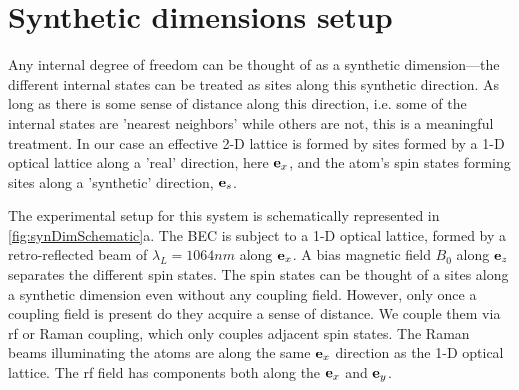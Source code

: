 %	

\section{Synthetic dimensions setup}\label{sec:SynDimSetup}

Any internal degree of freedom can be thought of as a synthetic dimension---the different internal states can be treated as sites along this synthetic direction. As long as there is some sense of distance along this direction, i.e. some of the internal states are 'nearest neighbors' while others are not, this is a meaningful treatment. In our case an effective 2-D lattice is formed by sites formed by a 1-D optical lattice along a 'real' direction, here  ${\bf e}_x$, and the atom's spin states forming sites along a 'synthetic' direction,  ${\bf e}_s$. 

The experimental setup for this system is schematically represented in \ref{fig:synDimSchematic}a. The BEC is subject to a 1-D optical lattice, formed by a retro-reflected beam of $\lambda_L=1064 nm$ along  ${\bf e}_x$. A bias magnetic field $B_0$ along  ${\bf e}_z$ separates the different spin states. The spin states can be thought of a sites along a synthetic dimension even without any coupling field. However, only once a coupling field is present do they acquire a sense of distance. We couple them via rf or Raman coupling, which only couples adjacent spin states. The Raman beams illuminating the atoms are along the same  ${\bf e}_x$ direction as the 1-D optical lattice. The rf field has components both along the  ${\bf e}_x$ and  ${\bf e}_y$. 


